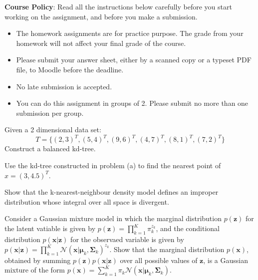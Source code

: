 \documentclass[a4 paper]{article}
\begin{document}
\textbf{Course Policy}: Read all the instructions below carefully before you start working on the assignment, and before you make a submission.
\begin{itemize}
    \item The homework assignments are for practice purpose. The grade from your homework will not affect your final grade of the course.
    \item Please submit your answer sheet, either by a scanned copy or a typeset PDF file, to Moodle before the deadline.
    \item No late submission is accepted.
    \item You can do this assignment in groups of 2. Please submit no more than one submission per group.
\end{itemize}

 Given a 2 dimensional data set:
\begin{equation*}
    T = \{(2, 3)^T, (5, 4)^T, (9, 6)^T, (4, 7)^T, (8, 1)^T, (7, 2)^T\}
\end{equation*}
Construct a balanced kd-tree.


 Use the kd-tree constructed in problem (a) to find the nearest point of $x=(3, 4.5)^T$.

\newpage

 Show that the k-nearest-neighbour density model defines an improper distribution whose integral over all space is divergent.


 Consider a Gaussian mixture model in which the marginal distribution $p(\mathbf{z})$ for the latent vatiable is given by $p(\mathbf{z})=\prod_{k=1}^{K} \pi_k^{z_k}$, and the conditional distribution $p(\mathbf{x}|\mathbf{z})$ for the observaed variable is given by $p(\mathbf{x}|\mathbf{z})=\prod_{k=1}^{K} \mathcal{N}(\mathbf{x}|\bm{\mu}_k, \bm{\Sigma}_k)^{z_k} $. Show that the marginal distribution $p(\mathbf{x})$, obtained by summing $p(\mathbf{z})p(\mathbf{x}|\mathbf{z})$ over all possible values of $\mathbf{z}$, is a Gaussian mixture of the form $p(\mathbf{x})=\sum_{k=1}^{K} \pi _k \mathcal{N}(\mathbf{x}|\bm{\mu}_k, \bm{\Sigma}_k)$.
\end{document}
